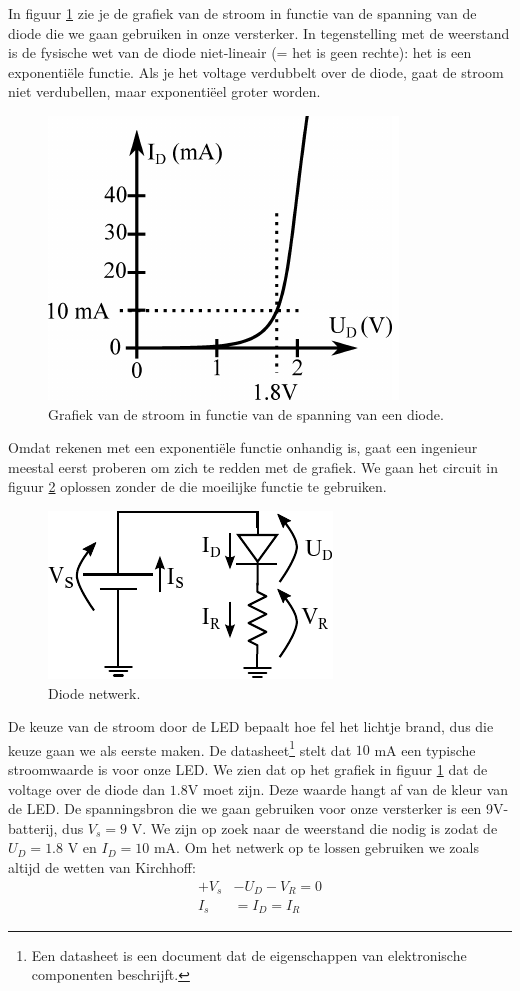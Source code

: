 \documentclass{article}
\begin{document}
			In figuur \ref{fig:diode_grafiek} zie je de grafiek van de stroom in functie van de spanning van de diode die we gaan gebruiken in onze versterker. In tegenstelling met de weerstand is de fysische wet van de diode niet-lineair (= het is geen rechte): het is een exponenti\"ele functie. Als je het voltage verdubbelt over de diode, gaat de stroom niet verdubellen, maar exponentiëel groter worden.
				\begin{figure}[htbp]
					\centering
					\includegraphics{diode_grafiek}
					\caption{Grafiek van de stroom in functie van de spanning van een diode.}
					\label{fig:diode_grafiek}
				\end{figure}
			Omdat rekenen met een exponenti\"ele functie onhandig is, gaat een ingenieur meestal eerst proberen om zich te redden met de grafiek. We gaan het circuit in figuur \ref{fig:diode_netwerk} oplossen zonder de die moeilijke functie te gebruiken.

			\begin{figure}[htbp]
				\centering
				\includegraphics{diode_netwerk}
				\caption{Diode netwerk.}
				\label{fig:diode_netwerk}
			\end{figure}

			De keuze van de stroom door de LED bepaalt hoe fel het lichtje brand, dus die keuze gaan we als eerste maken. De datasheet\footnote{Een datasheet is een document dat de eigenschappen van elektronische componenten beschrijft.} stelt dat $10$ mA een typische stroomwaarde is voor onze LED. We zien dat op het grafiek in figuur \ref{fig:diode_grafiek} dat de voltage over de diode dan $1.8 $V moet zijn. Deze waarde hangt af van de kleur van de LED. De spanningsbron die we gaan gebruiken voor onze versterker is een 9V-batterij, dus $V_s = 9$ V. We zijn op zoek naar de weerstand die nodig is zodat de $U_D = 1.8$ V en $I_D =10$ mA. Om het netwerk op te lossen gebruiken we zoals altijd de wetten van Kirchhoff:
			\begin{align}
				+V_s &- U_D - V_R = 0  \\
				I_s &= I_D = I_R
			\end{align}
\end{document}
